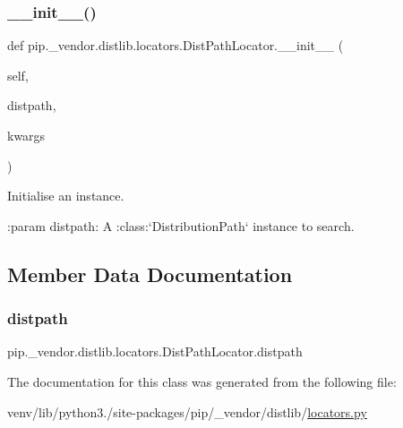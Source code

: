 \subsubsection{\texorpdfstring{\+\_\+\+\_\+init\+\_\+\+\_\+()}{\_\_init\_\_()}}
{\footnotesize\ttfamily def pip.\+\_\+vendor.\+distlib.\+locators.\+Dist\+Path\+Locator.\+\_\+\+\_\+init\+\_\+\+\_\+ (\begin{DoxyParamCaption}\item[{}]{self,  }\item[{}]{distpath,  }\item[{}]{kwargs }\end{DoxyParamCaption})}

\begin{DoxyVerb}Initialise an instance.

:param distpath: A :class:`DistributionPath` instance to search.
\end{DoxyVerb}
 

\subsection{Member Data Documentation}
\mbox{\label{classpip_1_1__vendor_1_1distlib_1_1locators_1_1DistPathLocator_adb796d43f555abed005db6c8e4b798ae}} 
\subsubsection{\texorpdfstring{distpath}{distpath}}
{\footnotesize\ttfamily pip.\+\_\+vendor.\+distlib.\+locators.\+Dist\+Path\+Locator.\+distpath}



The documentation for this class was generated from the following file\+:\begin{DoxyCompactItemize}
\item 
venv/lib/python3./site-\/packages/pip/\+\_\+vendor/distlib/\hyperlink{locators_8py}{locators.\+py}\end{DoxyCompactItemize}
